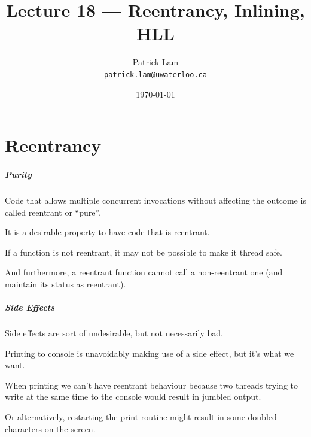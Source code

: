 

\title{Lecture 18 --- Reentrancy, Inlining, HLL }

\author{Patrick Lam \\ \small \texttt{patrick.lam@uwaterloo.ca}}
\date{\today}




\begin{frame}
  \titlepage

 \end{frame}


\part{Reentrancy}
\frame{\partpage}

\begin{frame}
\frametitle{Purity}

Code that allows multiple concurrent invocations without affecting the outcome is called reentrant or ``pure''. 

It is a desirable property to have code that is reentrant. 

If a function is not reentrant, it may not be possible to make it thread safe. 

And furthermore, a reentrant function cannot call a non-reentrant one (and maintain its status as reentrant).

\end{frame}



\begin{frame}
\frametitle{Side Effects}

Side effects are sort of undesirable, but not necessarily bad. 

Printing to console is unavoidably making use of a side effect, but it's what we want. 

When printing we can't have reentrant behaviour because two threads trying to write at the same time to the console would result in jumbled output. 

Or alternatively, restarting the print routine might result in some doubled characters on the screen.

\end{frame}



